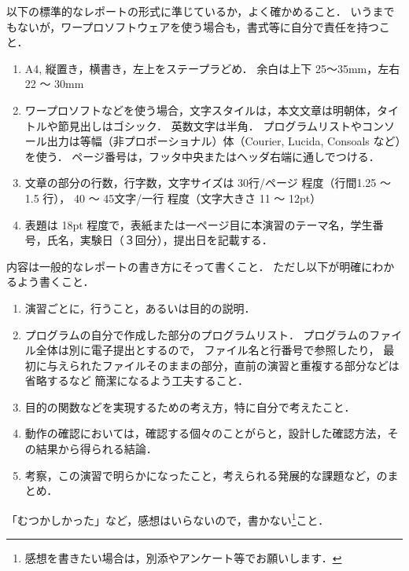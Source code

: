 \documentclass[11pt,a4,epsf]{jarticle}
\begin{document}
以下の標準的なレポートの形式に準じているか，よく確かめること．
いうまでもないが，ワープロソフトウェアを使う場合も，書式等に自分で責任を持つこと．
\begin{enumerate}
 \item A4, 縦置き，横書き，左上をステープラどめ．
余白は上下 25〜35mm，左右 22 〜 30mm
\item ワープロソフトなどを使う場合，文字スタイルは，本文文章は明朝体，タイトルや節見出しはゴシック．
英数文字は半角．
プログラムリストやコンソール出力は等幅（非プロポーショナル）体（Courier, Lucida, Consoals など）を使う．
ページ番号は，フッタ中央またはヘッダ右端に通しでつける．
 \item 文章の部分の行数，行字数，文字サイズは 30行/ページ 程度（行間1.25 〜 1.5 行），
40 〜 45文字/一行 程度（文字大きさ 11 〜 12pt）
\item 表題は 18pt 程度で，表紙または一ページ目に本演習のテーマ名，学生番号，氏名，実験日（３回分），提出日を記載する．
\end{enumerate}

内容は一般的なレポートの書き方にそって書くこと．
ただし以下が明確にわかるよう書くこと．
\begin{enumerate}
  \item 演習ごとに，行うこと，あるいは目的の説明．
  \item プログラムの自分で作成した部分のプログラムリスト．
プログラムのファイル全体は別に電子提出とするので，
ファイル名と行番号で参照したり，
最初に与えられたファイルそのままの部分，直前の演習と重複する部分などは省略するなど
簡潔になるよう工夫すること．
   \item 目的の関数などを実現するための考え方，特に自分で考えたこと．
   \item 動作の確認においては，確認する個々のことがらと，設計した確認方法，その結果から得られる結論．
   \item 考察，この演習で明らかになったこと，考えられる発展的な課題など，のまとめ．
\end{enumerate}
「むつかしかった」など，感想はいらないので，書かない\footnote{感想を書きたい場合は，別添やアンケート等でお願いします．}こと．

\end{document}
